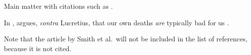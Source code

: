 \documentclass[british,a4paper]{article}
\begin{document}
Main matter with citations such as \textcite{lamport94}.

In , \citeauthor{nagel-death} argues,
\emph{contra} Lucretius, that our own deaths \emph{are}
typically bad for us \autocite*{nagel-death}.

Note that the article by Smith et al.\ will not be included in the list of
references, because it is not cited.

\printbibliography
\end{document}
